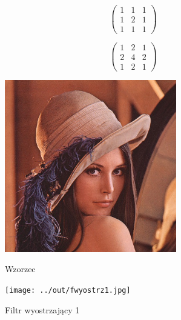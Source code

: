 \documentclass[a4paper,12pt]{article}
\begin{document}
\begin{figure}[h!]
\begin{minipage}[t]{7.5cm}
\begin{center}
\[ \left( \begin{array}{ccc}
1 & 1 & 1 \\
1 & 2 & 1 \\
1 & 1 & 1 \end{array} \right)\] 
\end{center}
\end{minipage}
\hfill
\begin{minipage}[t]{7.5cm}
\begin{center}
\[ \left( \begin{array}{ccc}
1 & 2 & 1 \\
2 & 4 & 2 \\
1 & 2 & 1 \end{array} \right)\] 
\end{center}
\end{minipage}
\end{figure}




\newpage
\begin{figure}[h!]
\begin{minipage}[t]{7.5cm}
\begin{center}
\includegraphics[width=7.5cm,clip]{../../lena.jpg}
\caption{Wzorzec}
\end{center}
\end{minipage}
\hfill
\begin{minipage}[t]{7.5cm}
\begin{center}
\texttt{[image: ../out/fwyostrz1.jpg]}
\caption{Filtr wyostrzający 1}
\end{center}
\end{minipage}
\end{figure}
\end{document}
